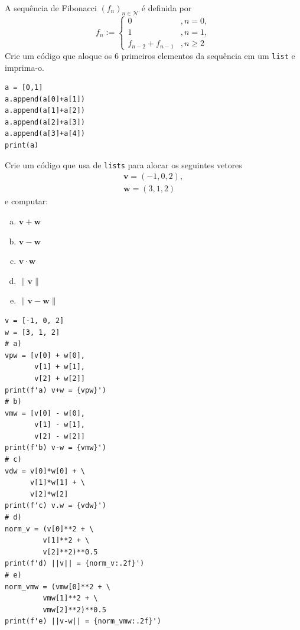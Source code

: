 \begin{exer}
  A sequência de Fibonacci{\fibonacci} $(f_n)_{n\in\mathcal{N}}$ é definida por
  \begin{equation}
    f_n := \left\{
    \begin{array}{ll}
      0 &, n=0,\\
      1 &, n=1,\\
      f_{n-2}+f_{n-1} &, n\geq 2
    \end{array}
  \right. 
\end{equation}
Crie um código que aloque os $6$ primeiros elementos da sequência em um \lstinline+list+ e imprima-o.
\end{exer}
\begin{resp}
\begin{lstlisting}
a = [0,1]
a.append(a[0]+a[1])
a.append(a[1]+a[2])
a.append(a[2]+a[3])
a.append(a[3]+a[4])
print(a)
\end{lstlisting}
\end{resp}

\begin{exer}
  Crie um código que usa de \lstinline+lists+ para alocar os seguintes vetores
  \begin{align}
    \pmb{v} = (-1, 0, 2),\\
    \pmb{w} = (3, 1, 2)
  \end{align}
  e computar:
  \begin{enumerate}[a)]
  \item $\pmb{v} + \pmb{w}$\\
  \item $\pmb{v} - \pmb{w}$\\
  \item $\pmb{v}\cdot \pmb{w}$\\
  \item $\|\pmb{v}\|$\\
  \item $\|\pmb{v} - \pmb{w}\|$
  \end{enumerate}
\end{exer}
\begin{resp}
\begin{lstlisting}
v = [-1, 0, 2]
w = [3, 1, 2]
# a)
vpw = [v[0] + w[0],
       v[1] + w[1],
       v[2] + w[2]]
print(f'a) v+w = {vpw}')
# b)
vmw = [v[0] - w[0],
       v[1] - w[1],
       v[2] - w[2]]
print(f'b) v-w = {vmw}')
# c)
vdw = v[0]*w[0] + \
      v[1]*w[1] + \
      v[2]*w[2]
print(f'c) v.w = {vdw}')
# d)
norm_v = (v[0]**2 + \
         v[1]**2 + \
         v[2]**2)**0.5
print(f'd) ||v|| = {norm_v:.2f}')
# e)
norm_vmw = (vmw[0]**2 + \
         vmw[1]**2 + \
         vmw[2]**2)**0.5
print(f'e) ||v-w|| = {norm_vmw:.2f}')
\end{lstlisting}
\end{resp}

